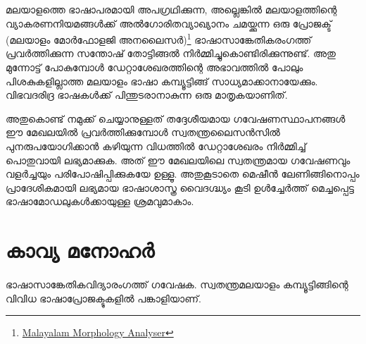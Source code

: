 \documentclass[12pt,twoside,a4paper]{article}
\begin{document}
മലയാളത്തെ ഭാഷാപരമായി അപഗ്രഥിക്കുന്ന, അല്ലെങ്കിൽ മലയാളത്തിന്റെ വ്യാകരണനിയമങ്ങൾക്ക് അൽഗോരിതവ്യാഖ്യാനം ചമയ്ക്കുന്ന ഒരു പ്രോജക്ട് (മലയാളം മോർഫോളജി അനലൈസർ)\footnote{{\href{https://morph.smc.org.in/generator}{Malayalam Morphology Analyser}}} ഭാഷാസാങ്കേതികരംഗത്ത് പ്രവർത്തിക്കുന്ന സന്തോഷ് തോട്ടിങ്ങൽ നിർമ്മിച്ചുകൊണ്ടിരിക്കുന്നുണ്ട്. അതു മുന്നോട്ട് പോകുമ്പോൾ ഡേറ്റാശേഖരത്തിന്റെ അഭാവത്തിൽ പോലും പിശകുകളില്ലാത്ത മലയാളം ഭാഷാ കമ്പ്യൂട്ടിങ്ങ് സാധ്യമാക്കാനായേക്കും. വിഭവദരിദ്ര ഭാഷകൾക്ക് പിന്തുടരാനാകുന്ന ഒരു മാതൃകയാണിത്.

അതുകൊണ്ട് നമുക്ക് ചെയ്യാനുള്ളത് തദ്ദേശീയമായ ഗവേഷണസ്ഥാപനങ്ങൾ ഈ മേഖലയിൽ പ്രവർത്തിക്കുമ്പോൾ സ്വതന്ത്രലൈസൻസിൽ പുനരുപയോഗിക്കാൻ കഴിയുന്ന വിധത്തിൽ ഡേറ്റാശേഖരം നിർമ്മിച്ച് 
പൊതുവായി ലഭ്യമാക്കുക.  അത് ഈ മേഖലയിലെ സ്വതന്ത്രമായ ഗവേഷണവും വളർച്ചയും പരിപോഷിപ്പിക്കുകയേ ഉള്ളൂ. അതുകൂടാതെ മെഷീൻ ലേണിങ്ങിനൊപ്പം പ്രാദേശികമായി ലഭ്യമായ ഭാഷാശാസ്ത്ര വൈദഗ്ദ്ധ്യം കൂടി ഉൾച്ചേർത്ത് മെച്ചപ്പെട്ട ഭാഷാമോഡലുകൾക്കായുള്ള ശ്രമവുമാകാം. 

\newpage

\section*{കാവ്യ മനോഹർ}
\paragraph{}
ഭാഷാസാങ്കേതികവിദ്യാരംഗത്ത് ഗവേഷക. സ്വതന്ത്രമലയാളം കമ്പ്യൂട്ടിങ്ങിന്റെ വിവിധ ഭാഷാപ്രോജക്ടുകളിൽ പങ്കാളിയാണ്. 
 
\end{document}
